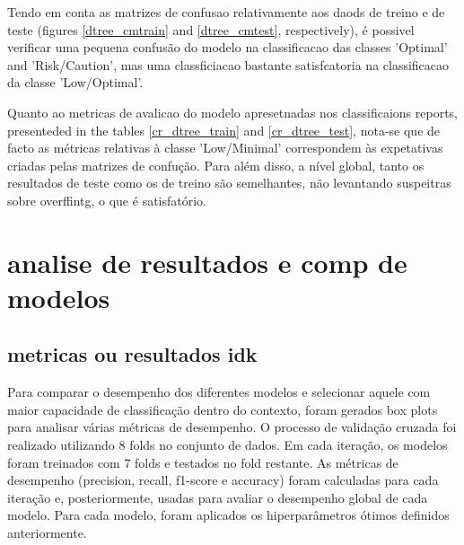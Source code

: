 \documentclass[conference]{IEEEtran}
\begin{document}
Tendo em conta as matrizes de confusao relativamente aos daods de treino e de teste (figures \ref{dtree_cmtrain} and \ref{dtree_cmtest}, respectively), é possivel verificar uma pequena confusão do modelo na classificacao das classes 'Optimal' and 'Risk/Caution', mas uma classficiacao bastante satisfcatoria na classificacao da classe 'Low/Optimal'.

Quanto ao metricas de avalicao do modelo apresetnadas nos classificaions reports, presenteded in the tables \ref{cr_dtree_train} and \ref{cr_dtree_test}, nota-se que de facto as métricas relativas à classe 'Low/Minimal' correspondem às expetativas criadas pelas matrizes de confução. Para além disso, a nível global, tanto os resultados de teste como os de treino são semelhantes, não levantando suspeitras sobre overffintg, o que é satisfatório.



\section{analise de resultados e comp de modelos}

\subsection{metricas ou resultados idk}

Para comparar o desempenho dos diferentes modelos e selecionar aquele com maior capacidade de classificação dentro do contexto, foram gerados box plots para analisar várias métricas de desempenho. O processo de validação cruzada foi realizado utilizando 8 folds no conjunto de dados. Em cada iteração, os modelos foram treinados com 7 folds e testados no fold restante. As métricas de desempenho (precision, recall, f1-score e accuracy) foram calculadas para cada iteração e, posteriormente, usadas para avaliar o desempenho global de cada modelo. Para cada modelo, foram aplicados os hiperparâmetros ótimos definidos anteriormente.
\end{document}
